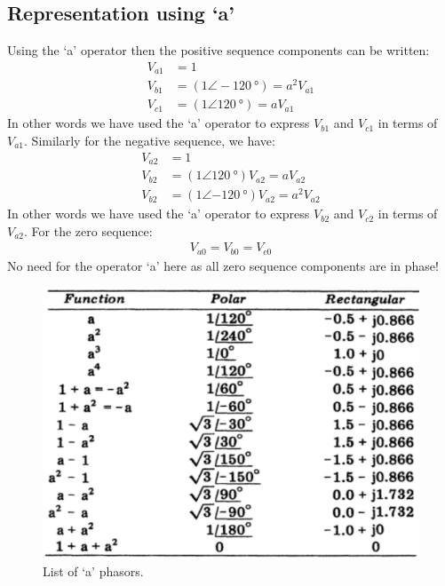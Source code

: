 \documentclass[class=report, crop=false, 12pt,a4paper]{standalone}
\begin{document}
\subsection{Representation using `a'}
Using the `a' operator then the positive sequence components can be written:
\begin{align}
	V_{a1} &= 1\\
	V_{b1} &= \left(1 \angle -\SI{120}{\degree}\right) = a^2 V_{a1}\\
	V_{c1} &= \left(1 \angle \SI{120}{\degree}\right) = a V_{a1}
\end{align}
In other words we have used the `a' operator to express $V_{b1}$ and $V_{c1}$ in terms of $V_{a1}$. Similarly for the negative sequence, we have:
\begin{align}
	V_{a2} &= 1\\
	V_{b2} &= \left(1 \angle \SI{120}{\degree}\right)V_{a2} = aV_{a2}\\
	V_{b2} &= \left(1 \angle \SI{-120}{\degree}\right)V_{a2} = a^2V_{a2}
\end{align}
In other words we have used the `a' operator to express $V_{b2}$ and $V_{c2}$ in terms of $V_{a2}$. For the zero sequence:
\begin{gather}
	V_{a0} = V_{b0} = V_{c0}
\end{gather}
No need for the operator `a' here as all zero sequence components are in phase!
\begin{figure}[H]
	\centering
	\includegraphics[width = \textwidth]{../img/figure29.png}
	\caption{List of `a' phasors.}
\end{figure}
\end{document}
